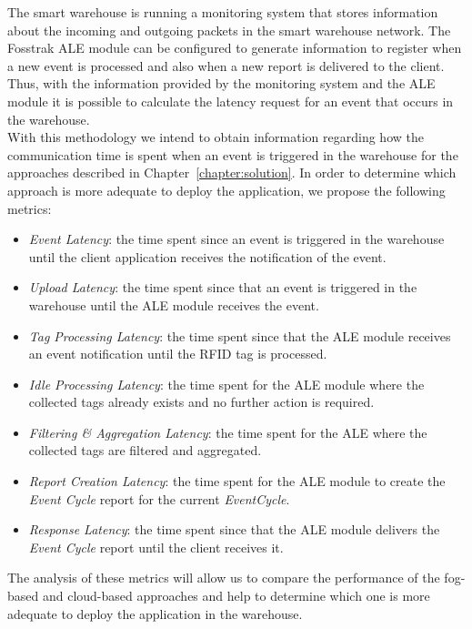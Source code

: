 The smart warehouse is running a monitoring system that stores information about the incoming and outgoing
packets in the smart warehouse network. The Fosstrak \gls{ALE} module can be configured to generate
information to register when a new event is processed and also when a new report is delivered to the
client. Thus, with the information provided by the monitoring system and the \gls{ALE} module it is
possible to calculate the latency request for an event that occurs in the warehouse.\\

With this methodology we intend to obtain information regarding how the communication time is spent
when an event is triggered in the warehouse for the approaches described in Chapter~\ref{chapter:solution}.
In order to determine which approach is more adequate to deploy the application, we propose the
following metrics:

\begin{itemize}
  \item \textit{Event Latency}: the time spent since an event is triggered in the warehouse until
  the client application receives the notification of the event.
  \item \textit{Upload Latency}: the time spent since that an event is triggered in the warehouse until
  the \gls{ALE} module receives the event.
  \item \textit{Tag Processing Latency}: the time spent since that the \gls{ALE} module receives an event
  notification until the \gls{RFID} tag is processed.
  \item \textit{Idle Processing Latency}: the time spent for the \gls{ALE} module where the collected
  tags already exists and no further action is required.
  \item \textit{Filtering \& Aggregation Latency}: the time spent for the \gls{ALE} where the
  collected tags are filtered and aggregated.
  \item \textit{Report Creation Latency}: the time spent for the \gls{ALE} module to create the
  \textit{Event Cycle} report for the current \textit{EventCycle}.
  \item \textit{Response Latency}: the time spent since that the \gls{ALE} module delivers the
  \textit{Event Cycle} report until the client receives it.
\end{itemize}

The analysis of these metrics will allow us to compare the performance of the fog-based and cloud-based
approaches and help to determine which one is more adequate to deploy the application in the warehouse.

